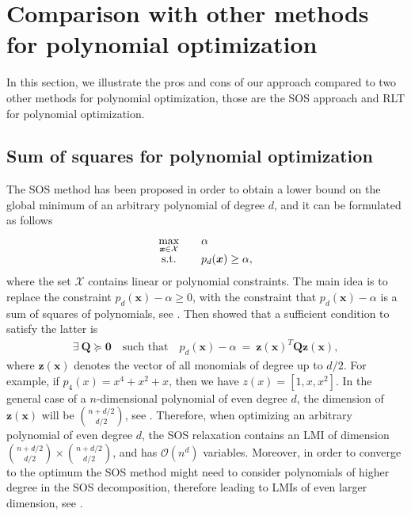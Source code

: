 \documentclass[opre,nonblindrev]{informs3} %
\begin{document}
\section{Comparison with other methods for polynomial optimization}   
In this section, we illustrate the pros and cons of our approach compared to two other methods for polynomial optimization, those are the SOS approach and RLT for polynomial optimization.
\subsection{Sum of squares for polynomial optimization}
The SOS method has been proposed in order to obtain a lower bound on the global minimum of an arbitrary polynomial of degree $d$, and it can be formulated as follows 
\begin{equation}
    \begin{array}{cll}
        \displaystyle \max_{\boldsymbol{x} \in \mathcal{X}} &\quad \alpha \\
        {\rm s.t.} 	&\quad p_d(\boldsymbol{x}) \ge \alpha,
    \end{array} \label{eq:sostools_1}
\end{equation}  
where the set $\mathcal{X}$ contains linear or polynomial constraints. The main idea is to replace the constraint $p_d(\boldsymbol{x}) - \alpha \ge 0$, with the constraint that $p_d(\boldsymbol{x}) - \alpha$ is a sum of squares of polynomials, see \cite{parrilo2001minimizing}. Then \cite{parrilo2003semidefinite} showed that a sufficient condition to satisfy the latter is 
\begin{align*}
  \exists \: \boldsymbol{Q} \succeq \boldsymbol{0} \quad \text{such that} \quad  p_d(\boldsymbol{x}) - \alpha \: = \: \boldsymbol{z}(\boldsymbol{x})^T \boldsymbol{Q} \boldsymbol{z}(\boldsymbol{x}),
\end{align*} 
where $\boldsymbol{z}(\boldsymbol{x})$ denotes the vector of all monomials of degree up to $d/2$. For example, if $p_4(x) = x^4+x^2+x$, then  we have $z(x) = [1,x,x^2]$. In the general case of a $n$-dimensional polynomial of even degree $d$, the dimension of $\boldsymbol{z}(\boldsymbol{x})$ will be $ \binom{n+d/2}{d/2}$, see \cite{parrilo2001minimizing}. Therefore, when optimizing an arbitrary polynomial of even degree $d$, the SOS relaxation contains an LMI of dimension $\binom{n+d/2}{d/2} \times \binom{n+d/2}{d/2}$, and has $\mathcal{O}(n^{d})$ variables. Moreover, in order to converge to the optimum the SOS method might need to consider polynomials of higher degree in the SOS decomposition, therefore leading to LMIs of even larger dimension, see \cite{parrilo2003semidefinite}.
\end{document}
